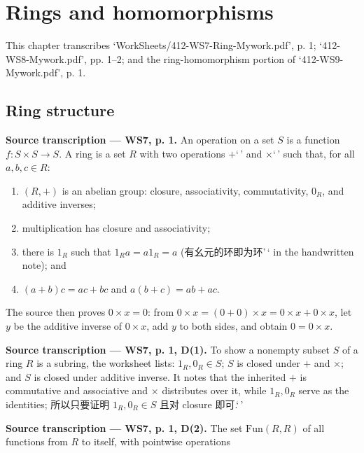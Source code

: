\chapter{Rings and homomorphisms}\label{rings-and-homomorphisms}

This chapter transcribes `WorkSheets/412-WS7-Ring-Mywork.pdf', p. 1; `412-WS8-Mywork.pdf', pp. 1--2; and the ring-homomorphism portion of `412-WS9-Mywork.pdf', p. 1.

\section{Ring structure}

\textbf{Source transcription --- WS7, p. 1.} An operation on a set \(S\) is a function \(f:S \times S\rightarrow S\). A ring is a set \(R\) with two operations \(+\)`\,' and \(\times\)`\,' such that, for all \(a,b,c \in R\):

\begin{enumerate}
\tightlist
\item
  \(\left( {R, +} \right)\) is an abelian group: closure, associativity, commutativity, \(0_{R}\), and additive inverses;
\item
  multiplication has closure and associativity;
\item
  there is \(1_{R}\) such that \(1_{R}a = a1_{R} = a\) (有幺元的环即为环'\,` in the handwritten note); and
\item
  \(\left( {a + b} \right)c = ac + bc\) and \(a\left( {b + c} \right) = ab + ac\).
\end{enumerate}

The source then proves \(0 \times x = 0\): from \(0 \times x = \left( {0 + 0} \right) \times x = 0 \times x + 0 \times x\), let \(y\) be the additive inverse of \(0 \times x\), add \(y\) to both sides, and obtain \(0 = 0 \times x\).

\textbf{Source transcription --- WS7, p. 1, D(1).} To show a nonempty subset \(S\) of a ring \(R\) is a subring, the worksheet lists: \(1_{R},0_{R} \in S\); \(S\) is closed under \(+\) and \(\times\); and \(S\) is closed under additive inverse. It notes that the inherited \(+\) is commutative and associative and \(\times\) distributes over it, while \(1_{R},0_{R}\) serve as the identities; 所以只要证明 \(1_{R},0_{R} \in S\) 且对 closure 即可.`\,'

\textbf{Source transcription --- WS7, p. 1, D(2).} The set \(\text{Fun}\left( {R,R} \right)\) of all functions from \(R\) to itself, with pointwise operations

